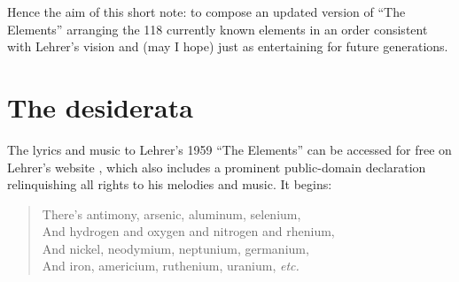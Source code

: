 \documentclass{article}
\begin{document}
Hence the aim of this short note: to compose an updated version of ``The Elements'' arranging the 118 currently known elements in an order consistent with Lehrer's vision and (may I hope) just as entertaining for future generations.

\section{The desiderata}

The lyrics and music to Lehrer's 1959 ``The Elements'' can be accessed for free on Lehrer's website \citep{LehrerTheElements}, which also includes a prominent public-domain declaration relinquishing all rights to his melodies and music. It begins:

\begin{verse}
  There's antimony, arsenic, aluminum, selenium,\\
  And hydrogen and oxygen and nitrogen and rhenium,\\
  And nickel, neodymium, neptunium, germanium,\\
  And iron, americium, ruthenium, uranium, \emph{etc.}
%  
%  
%  
%  
%  
%  
\end{verse}
\end{document}
